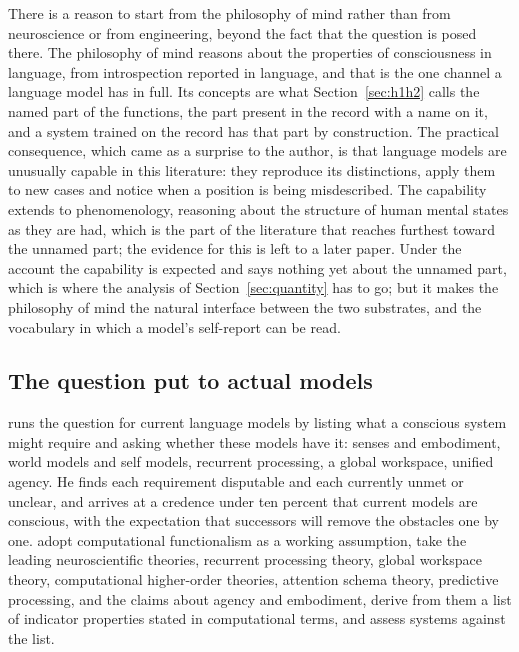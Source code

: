 There is a reason to start from the philosophy of mind rather than from neuroscience or from
engineering, beyond the fact that the question is posed there. The philosophy of mind reasons about
the properties of consciousness in language, from introspection reported in language, and that is the
one channel a language model has in full. Its concepts are what Section~\ref{sec:h1h2} calls the
named part of the functions, the part present in the record with a name on it, and a system trained
on the record has that part by construction. The practical consequence, which came as a surprise to
the author, is that language models are unusually capable in this literature: they reproduce its
distinctions, apply them to new cases and notice when a position is being misdescribed. The
capability extends to phenomenology, reasoning about the structure of human mental states as they are
had, which is the part of the literature that reaches furthest toward the unnamed part; the evidence
for this is left to a later paper. Under the account the capability is expected and says nothing yet
about the unnamed part, which is where the analysis of Section~\ref{sec:quantity} has to go; but it makes the philosophy of mind the natural interface
between the two substrates, and the vocabulary in which a model's self-report can be read.

\subsection{The question put to actual models}
\label{sec:applied}

\citet{chalmers2023} runs the question for current language models by listing what a conscious system
might require and asking whether these models have it: senses and embodiment, world models and self
models, recurrent processing, a global workspace, unified agency. He finds each requirement disputable
and each currently unmet or unclear, and arrives at a credence under ten percent that current models
are conscious, with the expectation that successors will remove the obstacles one by one.
\citet{butlin2023} adopt computational functionalism as a working assumption, take the leading
neuroscientific theories, recurrent processing theory, global workspace theory, computational
higher-order theories, attention schema theory, predictive processing, and the claims about agency and
embodiment, derive from them a list of indicator properties stated in computational terms, and assess
systems against the list.

